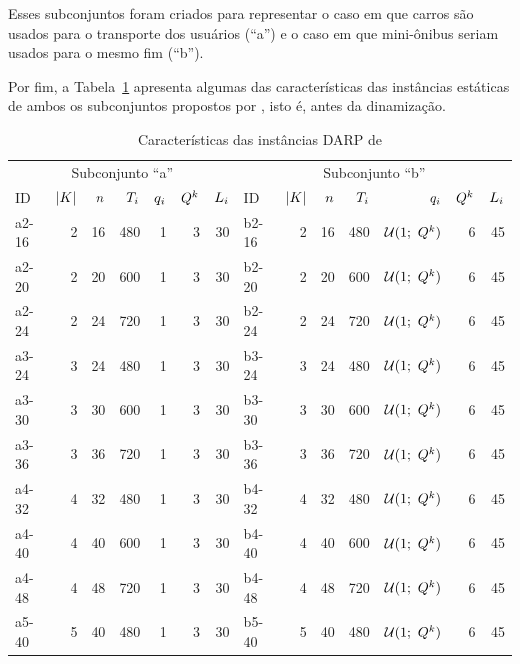 Esses subconjuntos foram criados para representar o caso em que carros são
usados para o transporte dos usuários (``a'') e o caso em que mini-ônibus 
seriam usados para o mesmo fim (``b'').

Por fim, a Tabela~\ref{tab:ropke_models_2007_DARP_instances_caracteristics}
apresenta algumas das características das instâncias estáticas de ambos os 
subconjuntos propostos por \textcite{ropke_models_2007}, isto é, antes da
dinamização.


\begin{table}[h]
\footnotesize
  \centering
  \caption{Características das instâncias DARP de 
           \textcite{ropke_models_2007}}
  \newcommand{\qib}{$\uniformDistribution{1}{\vehicleCapacity}$}
  \label{tab:ropke_models_2007_DARP_instances_caracteristics}
  \begin{tabular}{lrrrrrr|lrrrrrr}
    \toprule
    \multicolumn{7}{c|}{Subconjunto ``a''} &
    \multicolumn{7}{c}{Subconjunto ``b''} \\
    ID & $|K|$ & $n$ & $T_i$ & 
    $q_i$ & $Q^{k}$ & $L_i$ & 
    ID & $|K|$ & $n$ & $T_i$ & 
    $q_i$ & $Q^{k}$ & $L_i$\\
    \midrule
    a2-16 & 2 & 16 & 480 & 1 & 3 & 30 & b2-16 & 2 & 16 & 480 & \qib & 6 & 45\\
    a2-20 & 2 & 20 & 600 & 1 & 3 & 30 & b2-20 & 2 & 20 & 600 & \qib & 6 & 45\\
    a2-24 & 2 & 24 & 720 & 1 & 3 & 30 & b2-24 & 2 & 24 & 720 & \qib & 6 & 45\\
    a3-24 & 3 & 24 & 480 & 1 & 3 & 30 & b3-24 & 3 & 24 & 480 & \qib & 6 & 45\\
    a3-30 & 3 & 30 & 600 & 1 & 3 & 30 & b3-30 & 3 & 30 & 600 & \qib & 6 & 45\\
    a3-36 & 3 & 36 & 720 & 1 & 3 & 30 & b3-36 & 3 & 36 & 720 & \qib & 6 & 45\\
    a4-32 & 4 & 32 & 480 & 1 & 3 & 30 & b4-32 & 4 & 32 & 480 & \qib & 6 & 45\\
    a4-40 & 4 & 40 & 600 & 1 & 3 & 30 & b4-40 & 4 & 40 & 600 & \qib & 6 & 45\\
    a4-48 & 4 & 48 & 720 & 1 & 3 & 30 & b4-48 & 4 & 48 & 720 & \qib & 6 & 45\\
    a5-40 & 5 & 40 & 480 & 1 & 3 & 30 & b5-40 & 5 & 40 & 480 & \qib & 6 & 45\\

\end{tabular}
\end{table}
